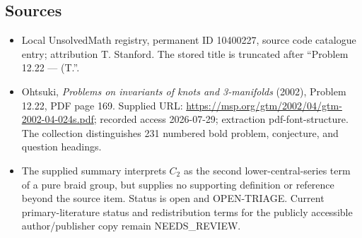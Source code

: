\documentclass[11pt]{article}
\begin{document}
\subsection{Sources}
\begin{itemize}
\item Local UnsolvedMath registry, permanent ID 10400227, source code catalogue entry; attribution T. Stanford. The stored title is truncated after ``Problem 12.22 --- (T.''.
\item Ohtsuki, \emph{Problems on invariants of knots and 3-manifolds} (2002), Problem 12.22, PDF page 169. Supplied URL: \url{https://msp.org/gtm/2002/04/gtm-2002-04-024s.pdf}; recorded access 2026-07-29; extraction pdf-font-structure. The collection distinguishes 231 numbered bold problem, conjecture, and question headings.
\item The supplied summary interprets \(C_2\) as the second lower-central-series term of a pure braid group, but supplies no supporting definition or reference beyond the source item. Status is open and OPEN-TRIAGE. Current primary-literature status and redistribution terms for the publicly accessible author/publisher copy remain NEEDS\_REVIEW.
\end{itemize}
\end{document}

